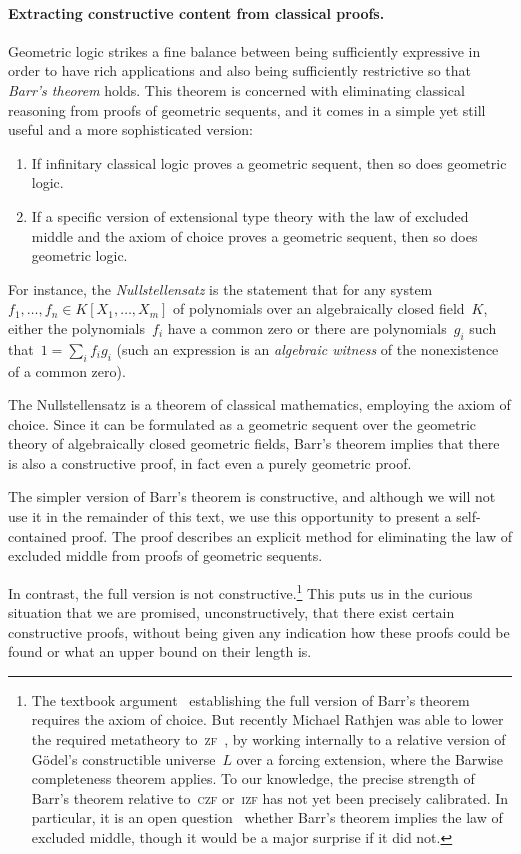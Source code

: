 \documentclass{ws-rv9x6}
\renewcommand{\_}{\mathpunct{.}}
\newcommand{\?}{\,{:}\,}
\begin{document}
\paragraph{Extracting constructive content from classical proofs.}\label{par:barr}
Geometric logic strikes a fine balance between being sufficiently expressive in order to
have rich applications and also being sufficiently restrictive so that \emph{Barr's
theorem} holds. This theorem is concerned with eliminating classical reasoning
from proofs of geometric sequents, and it comes in a simple yet still useful
and a more sophisticated version:
\begin{enumerate}
\item If infinitary classical logic proves a geometric sequent, then so does
geometric logic.
\item If a specific version of extensional type theory with the law of excluded
middle and the axiom of choice proves a geometric sequent, then so does
geometric logic.
\end{enumerate}
For instance, the \emph{Nullstellensatz} is the statement that for any
system~$f_1,\ldots,f_n \in K[X_1,\ldots,X_m]$ of polynomials over an
algebraically closed field~$K$, either the polynomials~$f_i$ have a common zero
or there are polynomials~$g_i$ such that~$1 = \sum_i f_i g_i$ (such an
expression is an \emph{algebraic witness} of the nonexistence of a common
zero).

The Nullstellensatz is a theorem of classical mathematics, employing the
axiom of choice. Since it can be formulated as a geometric sequent over the
geometric theory of algebraically closed geometric fields, Barr's theorem
implies that there is also a constructive proof, in fact even a purely
geometric proof.

The simpler version of Barr's theorem is constructive, and although we will not
use it in the remainder of this text, we use this opportunity to present a
self-contained proof. The proof describes an explicit method for eliminating
the law of excluded middle from proofs of geometric sequents.

In contrast, the full version is not constructive.\footnote{%
The textbook argument~\cite[Theorem~7.57]{johnstone:topos-theory} establishing
the full version of Barr's theorem requires the axiom of choice. But recently
Michael Rathjen was able to lower the required metatheory
to~\textsc{zf}~\cite[Remark~4.2]{rathjen:barr}, by working internally to a
relative version of Gödel's constructible universe~$L$ over a forcing
extension, where the Barwise completeness theorem applies. To our knowledge,
the precise strength of Barr's theorem relative to~\textsc{czf} or~\textsc{izf}
has not yet been precisely calibrated. In particular, it is an open
question~\cite{henry:question-barr} whether Barr's theorem implies the law of
excluded middle, though it would be a major surprise if it did not.}
This puts us in the curious situation that we are promised, unconstructively,
that there exist certain constructive proofs, without being given any indication how
these proofs could be found or what an upper bound on their length is.
\end{document}
